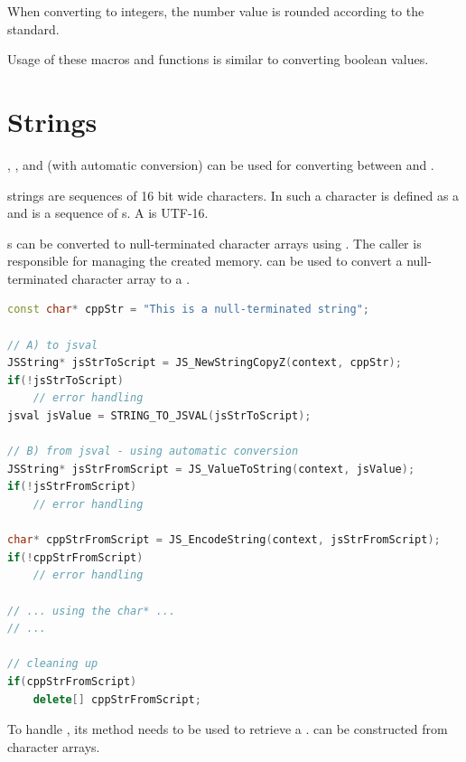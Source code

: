 When converting to integers, the number value is rounded according to the  standard.

Usage of these macros and functions is similar to converting boolean values.

\section{Strings}

, ,  and  (with automatic conversion) can be used for converting between  and .

 strings are sequences of 16 bit wide characters. In  such a character is defined as a  and  is a sequence of s. A  is UTF-16.

s can be converted to null-terminated  character arrays using \linebreak{}. The caller is responsible for managing the created memory. \linebreak{} can be used to convert a null-terminated character array to a .

\SingleSpacing
\begin{lstlisting}[language=C++, caption=Conversion of strings]
const char* cppStr = "This is a null-terminated string";

// A) to jsval
JSString* jsStrToScript = JS_NewStringCopyZ(context, cppStr);
if(!jsStrToScript)
	// error handling
jsval jsValue = STRING_TO_JSVAL(jsStrToScript);

// B) from jsval - using automatic conversion
JSString* jsStrFromScript = JS_ValueToString(context, jsValue);
if(!jsStrFromScript)
	// error handling
	
char* cppStrFromScript = JS_EncodeString(context, jsStrFromScript);
if(!cppStrFromScript)
	// error handling
	
// ... using the char* ...
// ...

// cleaning up
if(cppStrFromScript)
	delete[] cppStrFromScript;
\end{lstlisting}
\OnehalfSpacing

To handle , its  method needs to be used to retrieve a .  can be constructed from character arrays.

